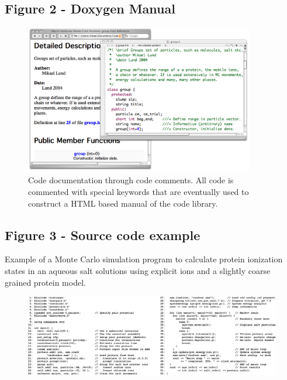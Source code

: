 \documentclass[10pt]{bmc_article}
\newenvironment{bmcformat}{\fussy\setboolean{publ}{true}}{\fussy}
\begin{document}
\begin{bmcformat}
  \subsection*{Figure 2 - Doxygen Manual}
      \begin{figure}[ht]\center
      \includegraphics[width=10cm]{pics/doxygen}
      \caption{Code documentation through code comments. All code is commented with
      special keywords that are eventually used to construct a HTML based manual of
      the code library.}
      \label{fig:doxygen}
      \end{figure}

  \subsection*{Figure 3 - Source code example}
      Example of a Monte Carlo simulation program to calculate protein
      ionization states in an aqueous salt solutions using explicit ions and
      a slightly coarse grained protein model.
      \begin{figure}[ht]\center
      \includegraphics[width=16.5cm]{pics/source}
      \end{figure}
      

\end{bmcformat}
\end{document}
